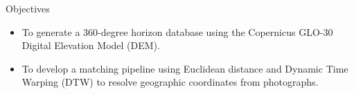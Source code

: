 
\begin{frame}{Objectives}
    \vspace{1em}
    \begin{itemize}
        \item To generate a 360-degree horizon database using the Copernicus GLO-30 Digital Elevation Model (DEM).
        \vspace{1em}
        \item To develop a matching pipeline using Euclidean distance and Dynamic Time Warping (DTW) to resolve geographic coordinates from photographs.
    \end{itemize}
\end{frame}